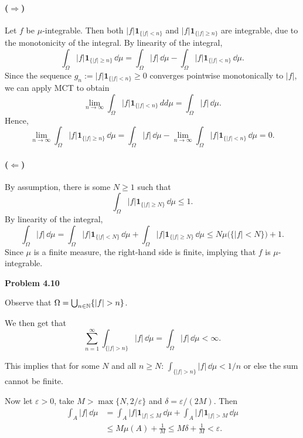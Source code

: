 \paragraph{($\Rightarrow$)} Let $f$ be $\mu$-integrable. Then both $|f|\mathbf{1}_{\{|f|<n\}}$ and $|f|\mathbf{1}_{\{|f|\ge n\}}$ are integrable, due to the monotonicity of the integral. By linearity of the integral,
\[
	\int_\Omega |f|\mathbf{1}_{\{|f|\ge n\}}\,\dd\mu = \int_\Omega |f|\,\dd\mu - \int_\Omega |f|\mathbf{1}_{\{|f|< n\}}\,\dd\mu.
\]
Since the sequence $g_n:= |f|\mathbf{1}_{\{|f|< n\}}\ge 0$ converges pointwise monotonically to $|f|$, we can apply MCT to obtain
\[
	\lim_{n\to\infty} \int_\Omega |f|\mathbf{1}_{\{|f|< n\}}\,dd\mu = \int_\Omega |f|\,\dd\mu.
\]
Hence,
\[	
	\lim_{n\to\infty}\int_\Omega |f|\mathbf{1}_{\{|f|\ge n\}}\,\dd\mu = \int_\Omega |f|\,\dd\mu - \lim_{n\to\infty}\int_\Omega |f|\mathbf{1}_{\{|f|< n\}}\,\dd\mu = 0.
\]

\paragraph{($\Leftarrow$)} By assumption, there is some $N\ge 1$ such that
\[
	\int_\Omega |f|\mathbf{1}_{\{|f|\ge N\}}\,\dd\mu \le 1.
\]
By linearity of the integral,
\[
	\int_\Omega |f|\,\dd\mu = \int_\Omega |f|\mathbf{1}_{\{|f|< N\}}\,\dd\mu +\int_\Omega |f|\mathbf{1}_{\{|f|\ge N\}}\,\dd\mu \le N \mu\bigl(\{|f|< N\}\bigr) + 1.
\]
Since $\mu$ is a finite measure, the right-hand side is finite, implying that $f$ is $\mu$-integrable.

\bigskip
\textbf{Problem 4.10}

Observe that $\Omega = \bigcup_{n \in \mathbb N} \{|f| > n\}$. 

We then get that
\[
	\sum_{n = 1}^\infty \int_{\{|f| > n\}} |f| \, \dd \mu = \int_\Omega |f| \, \dd \mu < \infty.
\]

This implies that for some $N$ and all $n \ge N$: $\int_{\{|f| > n\}} |f| \, \dd \mu < 1/n$ or else the sum cannot be finite.

Now let $\varepsilon > 0$, take $M > \max\{N, 2/\varepsilon\}$ and $\delta = \varepsilon/(2M)$. Then
\begin{align*}
	\int_A |f| \, \dd \mu &= \int_A |f| \mathbf{1}_{|f|\le M} \, \dd \mu + \int_A |f| \mathbf{1}_{|f|> M} \, \dd \mu\\
	&\le M \mu(A) + \frac{1}{M} \le M\delta + \frac{1}{M} < \varepsilon.
\end{align*}

